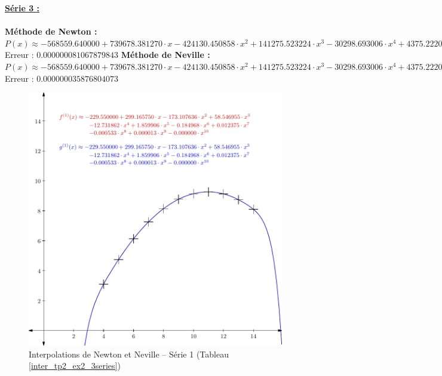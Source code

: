 \documentclass{report}
\begin{document}
	\noindent\underline{\textbf{Série 3 :}} \\ \\
	\textbf{Méthode de Newton :}\\
	$P(x) \approx -568559.640000 + 739678.381270 \cdot x- 424130.450858 \cdot x^{2}  + 141275.523224 \cdot x^{3} - 30298.693006 \cdot x^{4}  + 4375.222059 \cdot x^{5} - 431.155992 \cdot x^{6}  + 28.652640 \cdot x^{7} - 1.229803 \cdot x^{8}  + 0.030806 \cdot x^{9} - 0.000342 \cdot x^{10} $\\
	Erreur : $0.000000081067879843$
	\newline
	\newline
	\textbf{Méthode de Neville :}\\
	$P(x) \approx -568559.640000 + 739678.381270 \cdot x- 424130.450858 \cdot x^{2}  + 141275.523224 \cdot x^{3} - 30298.693006 \cdot x^{4}  + 4375.222059 \cdot x^{5} - 431.155992 \cdot x^{6}  + 28.652640 \cdot x^{7} - 1.229803 \cdot x^{8}  + 0.030806 \cdot x^{9} - 0.000342 \cdot x^{10} $\\
	Erreur : $0.000000035876804073$
	\newpage
	\begin{figure}[h]
	  \centering
  	\includegraphics[scale=0.5]{graphiques/pdf_output/inter_tp2_ex2_1.pdf}
	  \caption{Interpolations de Newton et Neville -- Série 1 (Tableau \ref{inter_tp2_ex2_3series})}
	\end{figure}
\end{document}
